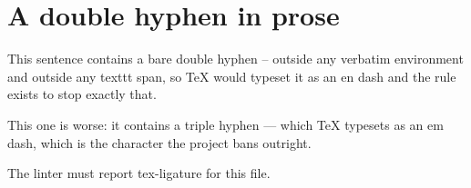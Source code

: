 \section{A double hyphen in prose}

This sentence contains a bare double hyphen -- outside any verbatim
environment and outside any texttt span, so TeX would typeset it as an en dash
and the rule exists to stop exactly that.

This one is worse: it contains a triple hyphen --- which TeX typesets as an em
dash, which is the character the project bans outright.

The linter must report tex-ligature for this file.
